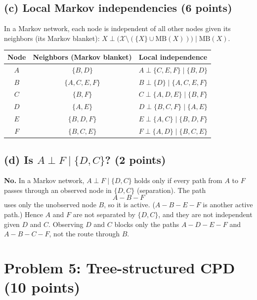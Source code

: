 \documentclass[11pt]{article}
\newcommand{\indep}{\perp}
\begin{document}
\subsection*{(c) Local Markov independencies (6 points)}

In a Markov network, each node is independent of all other nodes given its
neighbors (its Markov blanket):
$X \indep \bigl(\mathcal{X} \setminus (\{X\} \cup \mathrm{MB}(X))\bigr) \mid \mathrm{MB}(X)$.

\begin{center}
\begin{tabular}{c|c|l}
  \toprule
  Node & Neighbors (Markov blanket) & Local independence \\
  \midrule
  $A$ & $\{B, D\}$       & $A \indep \{C, E, F\} \mid \{B, D\}$ \\
  $B$ & $\{A, C, E, F\}$ & $B \indep \{D\} \mid \{A, C, E, F\}$ \\
  $C$ & $\{B, F\}$       & $C \indep \{A, D, E\} \mid \{B, F\}$ \\
  $D$ & $\{A, E\}$       & $D \indep \{B, C, F\} \mid \{A, E\}$ \\
  $E$ & $\{B, D, F\}$    & $E \indep \{A, C\} \mid \{B, D, F\}$ \\
  $F$ & $\{B, C, E\}$    & $F \indep \{A, D\} \mid \{B, C, E\}$ \\
  \bottomrule
\end{tabular}
\end{center}

\subsection*{(d) Is $A \indep F \mid \{D, C\}$? (2 points)}

\textbf{No.} In a Markov network, $A \indep F \mid \{D, C\}$ holds only if
every path from $A$ to $F$ passes through an observed node in $\{D, C\}$
(separation). The path
\[
  A - B - F
\]
uses only the unobserved node $B$, so it is active. ($A - B - E - F$ is
another active path.) Hence $A$ and $F$ are not separated by $\{D, C\}$,
and they are not independent given $D$ and $C$. Observing $D$ and $C$ blocks
only the paths $A - D - E - F$ and $A - B - C - F$, not the route through
$B$.

\section*{Problem 5: Tree-structured CPD (10 points)}
\end{document}
